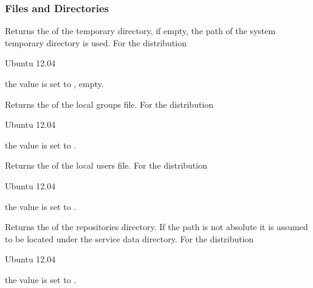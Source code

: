 \subsubsection{Files and Directories}


Returns the  of the temporary directory, if empty, the path
of the system temporary directory is used.
For the distribution
\begin{inparaitem}
\item[\TheDistribution{ubuntu}] Ubuntu 12.04
\end{inparaitem}
the value is set to \qcode{}, empty.


Returns the  of the local groups file.
For the distribution
\begin{inparaitem}
\item[\TheDistribution{ubuntu}] Ubuntu 12.04
\end{inparaitem}
the value is set to .


Returns the  of the local users file.
For the distribution
\begin{inparaitem}
\item[\TheDistribution{ubuntu}] Ubuntu 12.04
\end{inparaitem}
the value is set to .


Returns the  of the repositories directory. If the path is not
absolute it is assumed to be located under the service
data directory.
For the distribution
\begin{inparaitem}
\item[\TheDistribution{ubuntu}] Ubuntu 12.04
\end{inparaitem}
the value is set to .

